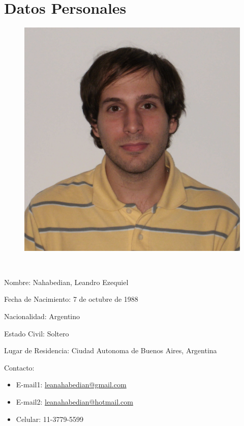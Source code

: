 \section{Datos Personales}

\begin{figure}
\includegraphics[scale=0.06]{img/Lea}
\end{figure}

\ 

\begin{itemize}
\begin{normalsize}\normalsize \item  Nombre: Nahabedian, Leandro Ezequiel
\item Fecha de Nacimiento: 7 de octubre de 1988
\item Nacionalidad: Argentino
\item Estado Civil: Soltero
\item Lugar de Residencia: Ciudad Autonoma de Buenos Aires, Argentina
\item Contacto:
\end{normalsize}
\begin{itemize}
\item E-mail1: \href{mailto:leanahabedian@gmail.com}{leanahabedian@gmail.com}
\item E-mail2: \href{mailto:leanahabedian@hotmail.com}{leanahabedian@hotmail.com}
\item Celular: 11-3779-5599
\end{itemize} 
\end{itemize}

